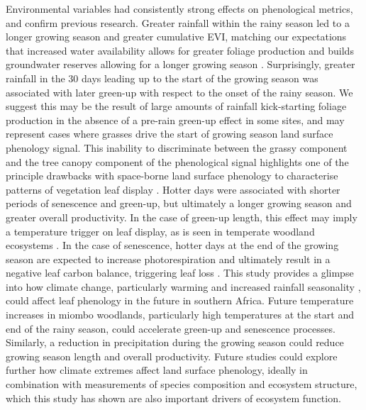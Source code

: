 \documentclass[11pt,a4paper]{article}
\begin{document}
Environmental variables had consistently strong effects on phenological
metrics, and confirm previous research. Greater rainfall within the rainy
season led to a longer growing season and greater cumulative EVI, matching our
expectations that increased water availability allows for greater foliage
production and builds groundwater reserves allowing for a longer growing season
\citep{Adole2018b}. Surprisingly, greater rainfall in the 30 days leading up to
the start of the growing season was associated with later green-up with respect
to the onset of the rainy season. We suggest this may be the result of large
amounts of rainfall kick-starting foliage production in the absence of a
pre-rain green-up effect in some sites, and may represent cases where grasses
drive the start of growing season land surface phenology signal. This inability
to discriminate between the grassy component and the tree canopy component of
the phenological signal highlights one of the principle drawbacks with
space-borne land surface phenology to characterise patterns of vegetation leaf
display \citep{Archibald2007}. Hotter days were associated with shorter periods
of senescence and green-up, but ultimately a longer growing season and greater
overall productivity. In the case of green-up length, this effect may imply a
temperature trigger on leaf display, as is seen in temperate woodland
ecosystems \citep{Flynn2018}. In the case of senescence, hotter days at the end
of the growing season are expected to increase photorespiration and ultimately
result in a negative leaf carbon balance, triggering leaf loss
\citep{Warren2011, Marin2019}. This study provides a glimpse into how climate
change, particularly warming \citep{IPCC} and increased rainfall seasonality
\citep{Wainwright2021}, could affect leaf phenology in the future in southern
Africa. Future temperature increases in miombo woodlands, particularly high
temperatures at the start and end of the rainy season, could accelerate
green-up and senescence processes. Similarly, a reduction in precipitation
during the growing season could reduce growing season length and overall
productivity. Future studies could explore further how climate extremes affect
land surface phenology, ideally in combination with measurements of species
composition and ecosystem structure, which this study has shown are also
important drivers of ecosystem function.
\end{document}
